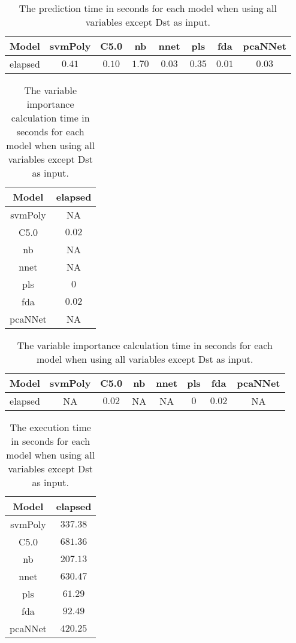 \begin{table}[!ht]
	\centering
	\begin{tabular}{|c|c|c|c|c|c|c|c|}
		\hline
		Model & svmPoly & C5.0 & nb & nnet & pls & fda & pcaNNet \\ \hline
		elapsed & $0.41$ & $0.10$ & $1.70$ & $0.03$ & $0.35$ & $0.01$ & $0.03$ \\ \hline
	\end{tabular}
	\caption{The prediction time in seconds for each model when using all variables except Dst as input.}
	\label{tab:time:reverse:noDst:predict}
\end{table}

\begin{table}[!ht]
	\centering
	\begin{tabular}{|c|c|}
		\hline
		Model & elapsed \\ \hline
		svmPoly & NA \\ \hline
		C5.0 & $0.02$ \\ \hline
		nb & NA \\ \hline
		nnet & NA \\ \hline
		pls & $0$ \\ \hline
		fda & $0.02$ \\ \hline
		pcaNNet & NA \\ \hline
	\end{tabular}
	\caption{The variable importance calculation time in seconds for each model when using all variables except Dst as input.}
	\label{tab:time:noDst:importance}
\end{table}

\begin{table}[!ht]
	\centering
	\begin{tabular}{|c|c|c|c|c|c|c|c|}
		\hline
		Model & svmPoly & C5.0 & nb & nnet & pls & fda & pcaNNet \\ \hline
		elapsed & NA & $0.02$ & NA & NA & $0$ & $0.02$ & NA \\ \hline
	\end{tabular}
	\caption{The variable importance calculation time in seconds for each model when using all variables except Dst as input.}
	\label{tab:time:reverse:noDst:importance}
\end{table}

\begin{table}[!ht]
	\centering
	\begin{tabular}{|c|c|}
		\hline
		Model & elapsed \\ \hline
		svmPoly & $337.38$ \\ \hline
		C5.0 & $681.36$ \\ \hline
		nb & $207.13$ \\ \hline
		nnet & $630.47$ \\ \hline
		pls & $61.29$ \\ \hline
		fda & $92.49$ \\ \hline
		pcaNNet & $420.25$ \\ \hline
	\end{tabular}
	\caption{The execution time in seconds for each model when using all variables except Dst as input.}
	\label{tab:time:noDst:total}
\end{table}

